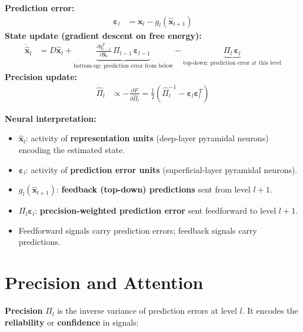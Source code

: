 \documentclass[11pt,a4paper]{report}
\begin{document}
\begin{fepbox}
\textbf{Prediction error:}
\begin{align}
  \boldsymbol{\varepsilon}_l &= \mathbf{x}_l - g_l(\hat{\mathbf{x}}_{l+1}) \label{eq:pe}
\end{align}
\textbf{State update (gradient descent on free energy):}
\begin{align}
  \dot{\hat{\mathbf{x}}}_{l} &= D\hat{\mathbf{x}}_{l} + \underbrace{\frac{\partial g_{l-1}^T}{\partial \hat{\mathbf{x}}_l}\, \Pi_{l-1}\, \boldsymbol{\varepsilon}_{l-1}}_{\text{bottom-up: prediction error from below}} - \underbrace{\Pi_l\, \boldsymbol{\varepsilon}_l}_{\text{top-down: prediction error at this level}} \label{eq:state_update}
\end{align}
\textbf{Precision update:}
\begin{align}
  \dot{\hat{\Pi}}_l &\propto -\frac{\partial F}{\partial \hat{\Pi}_l} = \frac{1}{2}\left(\hat{\Pi}_l^{-1} - \boldsymbol{\varepsilon}_l \boldsymbol{\varepsilon}_l^T\right) \label{eq:prec_update}
\end{align}
\end{fepbox}

\textbf{Neural interpretation:}
\begin{itemize}[leftmargin=1.5em]
  \item $\hat{\mathbf{x}}_l$: activity of \textbf{representation units} (deep-layer pyramidal neurons) encoding the estimated state.
  \item $\boldsymbol{\varepsilon}_l$: activity of \textbf{prediction error units} (superficial-layer pyramidal neurons).
  \item $g_l(\hat{\mathbf{x}}_{l+1})$: \textbf{feedback (top-down) predictions} sent from level $l{+}1$.
  \item $\Pi_l \boldsymbol{\varepsilon}_l$: \textbf{precision-weighted prediction error} sent feedforward to level $l{+}1$.
  \item Feedforward signals carry prediction errors; feedback signals carry predictions.
\end{itemize}

\section{Precision and Attention}

\textbf{Precision} $\Pi_l$ is the inverse variance of prediction errors at level $l$. It encodes the \textbf{reliability} or \textbf{confidence} in signals:
\end{document}

